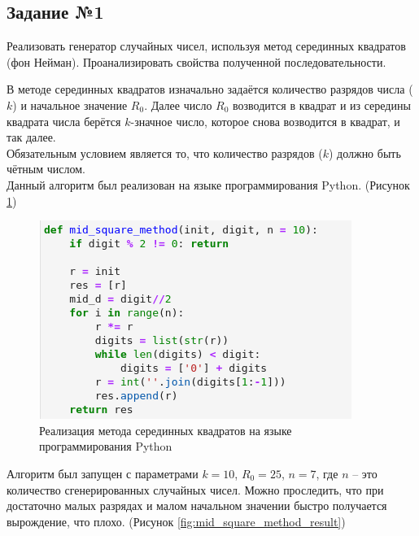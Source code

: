 \documentclass[14pt,fleqn]{extarticle}
\begin{document}
    \subsection*{Задание №1}
    Реализовать генератор случайных чисел, используя метод серединных квадратов (фон Нейман). Проанализировать свойства полученной последовательности.\\
    \newline

    В методе серединных квадратов изначально задаётся количество разрядов числа ($k$) и начальное значение $R_0$. Далее число $R_0$ возводится в квадрат и из середины квадрата числа берётся $k$-значное число, которое снова возводится в квадрат, и так далее.\\
    Обязательным условием является то, что количество разрядов ($k$) должно быть чётным числом.\\
    \newline
    Данный алгоритм был реализован на языке программирования Python. (Рисунок \ref{fig:mid_square_method_code})
    \begin{figure}[h]
        \centering \includegraphics[scale=0.8]{code1}
        \caption{Реализация метода серединных квадратов на языке программирования Python}
        \label{fig:mid_square_method_code}
    \end{figure}
    \newpage
    Алгоритм был запущен с параметрами $k = 10$, $R_0 = 25$, $n = 7$, где $n$ -- это количество сгенерированных случайных чисел. Можно проследить, что при достаточно малых разрядах и малом начальном значении быстро получается вырождение, что плохо. (Рисунок \ref{fig:mid_square_method_result})
\end{document}

